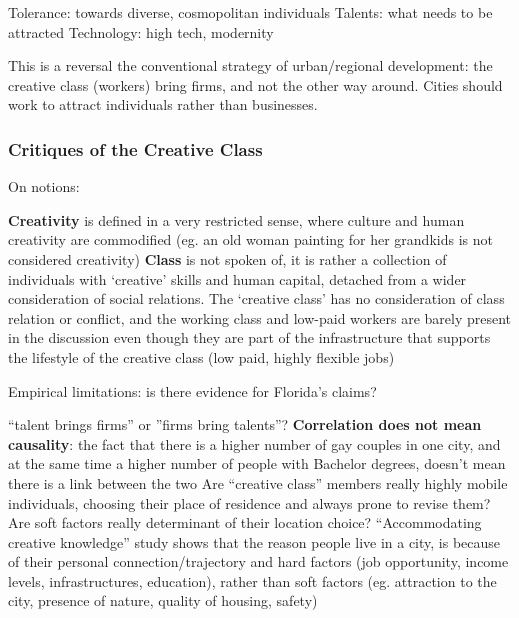 \documentclass{article}
\begin{document}
\begin{outline}
	\1 Tolerance: towards diverse, cosmopolitan individuals
	\1 Talents: what needs to be attracted
	\1 Technology: high tech, modernity
\end{outline}

This is a reversal the conventional strategy of urban/regional development: the creative class (workers) bring firms, and not the other way around. Cities should work to attract individuals rather than businesses.

\subsubsection{Critiques of the Creative Class}

On notions:

\begin{outline}
	\1 \textbf{Creativity} is defined in a very restricted sense, where culture and human creativity are commodified (eg. an old woman painting for her grandkids is not considered creativity)
	\1 \textbf{Class} is not spoken of, it is rather a collection of individuals with `creative' skills and human capital, detached from a wider consideration of social relations. The `creative class' has no consideration of class relation or conflict, and the working class and low-paid workers are barely present in the discussion even though they are part of the infrastructure that supports the lifestyle of the creative class (low paid, highly flexible jobs)
\end{outline}

Empirical limitations: is there evidence for Florida's claims?

\begin{outline}
	\1 ``talent brings firms'' or ''firms bring talents''?
		\2 \textbf{Correlation does not mean causality}: the fact that there is a higher number of gay couples in one city, and at the same time a higher number of people with Bachelor degrees, doesn't mean there is a link between the two
	\1 Are ``creative class'' members really highly mobile individuals, choosing their place of residence and always prone to revise them?	
	\1 Are soft factors really determinant of their location choice?
		\2 ``Accommodating creative knowledge'' study shows that the reason people live in a city, is because of their personal connection/trajectory and hard factors (job opportunity, income levels, infrastructures, education), rather than soft factors (eg. attraction to the city, presence of nature, quality of housing, safety)
\end{outline}
\end{document}
